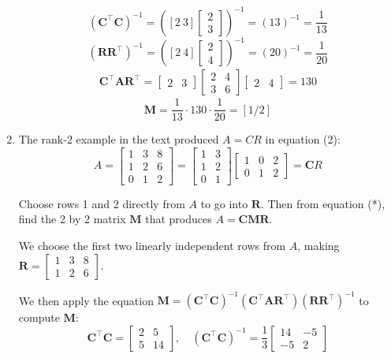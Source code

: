\documentclass{scrartcl}
\begin{document}
\begin{enumerate}
$$(\mathbf{C}^\top \mathbf{C})^{-1} = \left([2 \ 3] \begin{bmatrix}
	2 \\ 3
\end{bmatrix}\right)^{-1} = (13)^{-1} = \frac{1}{13}$$
$$(\mathbf{R}\mathbf{R}^\top)^{-1} = \left([2 \ 4]\begin{bmatrix}
	2 \\ 4
\end{bmatrix}\right)^{-1} = (20)^{-1} = \frac{1}{20}$$
\begin{align*}
	\mathbf{C}^\top \mathbf{A}\mathbf{R}^\top = \begin{bmatrix}
		2 & 3
	\end{bmatrix}\begin{bmatrix}
		2 & 4 \\ 3 & 6
	\end{bmatrix}\begin{bmatrix}
		2 & 4
	\end{bmatrix} = 130
\end{align*}
$$\mathbf{M} = \frac{1}{13}\cdot 130 \cdot \frac{1}{20} = [1/2]$$

\item The rank-2 example in the text produced $A = CR$ in equation (2):
$$A = \begin{bmatrix}
	1 & 3 & 8 \\ 1 & 2 & 6 \\ 0 & 1 & 2
\end{bmatrix} = \begin{bmatrix}
	1 & 3 \\ 1 & 2 \\ 0 & 1
\end{bmatrix} \begin{bmatrix}
	1 & 0 & 2 \\ 0 & 1 & 2
\end{bmatrix} = \mathbf{C}R$$

Choose rows 1 and 2 directly from $A$ to go into $\mathbf{R}$. Then from equation (*), find the 2 by 2 matrix $\mathbf{M}$ that produces $A = \mathbf{CMR}$. 

We choose the first two linearly independent rows from $A$, making $\mathbf{R} = \begin{bmatrix}
	1 & 3 & 8 \\ 1 & 2 & 6
\end{bmatrix}$.

We then apply the equation $\mathbf{M} = (\mathbf{C}^\top \mathbf{C})^{-1}(\mathbf{C}^\top \mathbf{AR}^\top)(\mathbf{RR}^\top)^{-1}$ to compute $\mathbf{M}$:
$$\mathbf{C}^\top \mathbf{C} = \begin{bmatrix}
	2 & 5 \\ 5 & 14
\end{bmatrix}, \quad (\mathbf{C}^\top \mathbf{C})^{-1} = \frac{1}{3}\begin{bmatrix}
	14 & -5 \\ -5 & 2
\end{bmatrix}$$


\end{enumerate}
\end{document}
